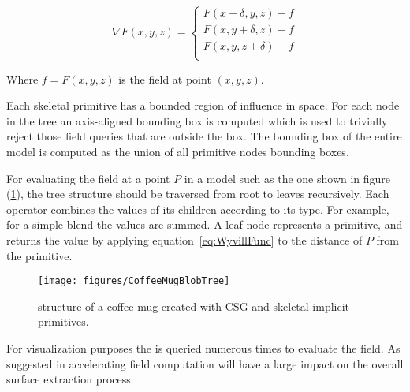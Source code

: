 \begin{equation}
\nabla F(x,y,z)=\left\{ \begin{array}{rl}
 F(x+\delta,y,z)-f \\
 F(x, y +\delta,z)-f \\
 F(x, y, z+\delta)-f \\
  \end{array} \right. 
\label{eq:Normal}
\end{equation}

Where $f = F(x,y,z)$ is the field at point $(x,y,z)$.

Each skeletal primitive has a bounded region of influence in space. For each node in the tree an
axis-aligned bounding box is computed which is used to trivially reject those field queries that 
are outside the box. The bounding box of the entire model is computed as the union of all primitive
nodes bounding boxes.

For evaluating the field  at a point $P$ in a \blob model such as the one shown in figure (\ref{fig:CoffeeMugBlobTree}), 
the tree structure should be traversed from root to leaves recursively. 
Each operator combines the values of its children according to its type.
For example, for a simple blend the values are summed. A leaf node represents
a primitive,  and returns the value by applying equation~\ref{eq:WyvillFunc} to 
  the distance of $P$ from the primitive.

\begin{figure}[htb]
  \centering
  \texttt{[image: figures/CoffeeMugBlobTree]}
  \caption{\label{fig:CoffeeMugBlobTree}
           \blob structure of a coffee mug created with CSG and skeletal implicit primitives.}
\end{figure}

For visualization purposes the \blob is queried numerous times to evaluate the field. As suggested in \cite{SWG2005} 
accelerating field computation will have a large impact on the overall surface extraction process. 

